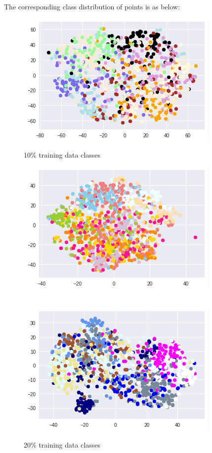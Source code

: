 \documentclass{article}
\begin{document}
The corresponding class distribution of points is as below:
\begin{figure}[!htb]
	\includegraphics[width=\linewidth]{../output_plots/CIFAR/clustering/class-dstribution-10.png}
	\caption{10\% training data classes}\label{fig:part_2_task_5_class_10}
	\endminipage\hfill
	\includegraphics[width=\linewidth]{../output_plots/CIFAR/clustering/class-dstribution-20.png}
	\caption{20\% training data classes}\label{fig:part_2_task_5_class_20}
	\endminipage\\
	\includegraphics[width=\linewidth]{../output_plots/CIFAR/clustering/class-dstribution-30.png}

\end{figure}
\end{document}

